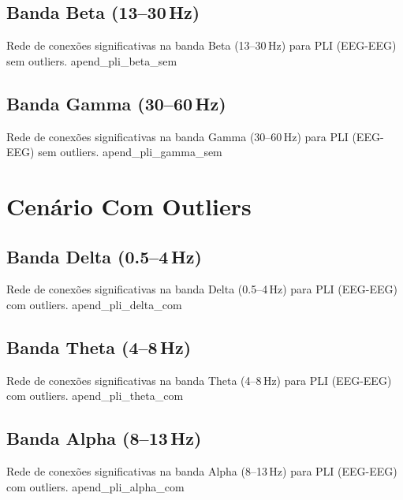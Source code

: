 \begin{apendicesenv}
  \subsection{Banda Beta (13--30\,Hz)}
  {Rede de conexões significativas na banda Beta (13--30\,Hz) para PLI (EEG-EEG) sem outliers.}
  {apend_pli_beta_sem}
  
  \subsection{Banda Gamma (30--60\,Hz)}
  {Rede de conexões significativas na banda Gamma (30--60\,Hz) para PLI (EEG-EEG) sem outliers.}
  {apend_pli_gamma_sem}
  
  \section{Cenário Com Outliers}
  
  \subsection{Banda Delta (0.5--4\,Hz)}
  {Rede de conexões significativas na banda Delta (0.5--4\,Hz) para PLI (EEG-EEG) com outliers.}
  {apend_pli_delta_com}
  
  \subsection{Banda Theta (4--8\,Hz)}
  {Rede de conexões significativas na banda Theta (4--8\,Hz) para PLI (EEG-EEG) com outliers.}
  {apend_pli_theta_com}
  
  \subsection{Banda Alpha (8--13\,Hz)}
  {Rede de conexões significativas na banda Alpha (8--13\,Hz) para PLI (EEG-EEG) com outliers.}
  {apend_pli_alpha_com}
  

\end{apendicesenv}
